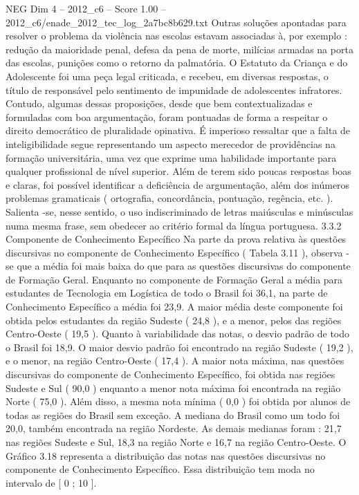 \begin{textsample}{NEG Dim 4 – 2012\_c6 – Score 1.00 – 2012\_c6/enade\_2012\_tec\_log\_2a7bc8b629.txt}
Outras soluções apontadas para resolver o problema da violência nas escolas estavam associadas à, por exemplo : redução da maioridade penal, defesa da pena de morte, milícias armadas na porta das escolas, punições como o retorno da palmatória.
O Estatuto da Criança e do Adolescente foi uma peça legal criticada, e recebeu, em diversas respostas, o título de responsável pelo sentimento de impunidade de adolescentes infratores.
Contudo, algumas dessas proposições, desde que bem contextualizadas e formuladas com boa argumentação, foram pontuadas de forma a respeitar o direito democrático de pluralidade opinativa.
É imperioso ressaltar que a falta de inteligibilidade segue representando um aspecto merecedor de providências na formação universitária, uma vez que exprime uma habilidade importante para qualquer profissional de nível superior.
Além de terem sido poucas respostas boas e claras, foi possível identificar a deficiência de argumentação, além dos inúmeros problemas gramaticais ( ortografia, concordância, pontuação, regência, etc. ).
Salienta -se, nesse sentido, o uso indiscriminado de letras maiúsculas e minúsculas numa mesma frase, sem obedecer ao critério formal da língua portuguesa. 3.3.2 Componente de Conhecimento Específico Na parte da prova relativa às questões discursivas no componente de Conhecimento Específico ( Tabela 3.11 ), observa -se que a média foi mais baixa do que para as questões discursivas do componente de Formação Geral.
Enquanto no componente de Formação Geral a média para estudantes de Tecnologia em Logística de todo o Brasil foi 36,1, na parte de Conhecimento Específico a média foi 23,9.
A maior média deste componente foi obtida pelos estudantes da região Sudeste ( 24,8 ), e a menor, pelos das regiões Centro-Oeste ( 19,5 ).
Quanto à variabilidade das notas, o desvio padrão de todo o Brasil foi 18,9.
O maior desvio padrão foi encontrado na região Sudeste ( 19,2 ), e o menor, na região Centro-Oeste ( 17,4 ).
A maior nota máxima, nas questões discursivas do componente de Conhecimento Específico, foi obtida nas regiões Sudeste e Sul ( 90,0 ) enquanto a menor nota máxima foi encontrada na região Norte ( 75,0 ).
Além disso, a mesma nota mínima ( 0,0 ) foi obtida por alunos de todas as regiões do Brasil sem exceção.
A mediana do Brasil como um todo foi 20,0, também encontrada na região Nordeste.
As demais medianas foram : 21,7 nas regiões Sudeste e Sul, 18,3 na região Norte e 16,7 na região Centro-Oeste.
O Gráfico 3.18 representa a distribuição das notas nas questões discursivas no componente de Conhecimento Específico.
Essa distribuição tem moda no intervalo de [ 0 ; 10 ].

\end{textsample}

